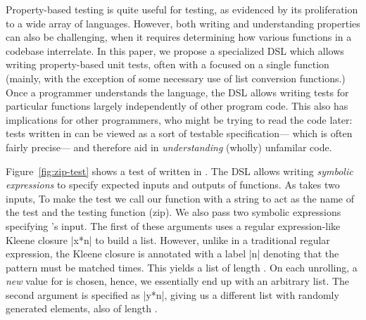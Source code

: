 Property-based testing is quite useful for testing,
as evidenced by its proliferation to a wide array of languages.
However,
both writing and understanding properties can also be challenging,
when it requires determining how various functions in a codebase interrelate.
In this paper,
we propose a specialized DSL \ourDSL
which allows writing property-based unit tests, often with a focused on a single function
(mainly, with the exception of some necessary use of list conversion functions.)
Once a programmer understands the language,
the DSL allows writing tests for particular functions largely independently of
other program code.
This also has implications for other programmers, who might be trying to read the code later:
tests written in \ourDSL can be viewed as a sort of testable specification--- which is often fairly precise---
and therefore aid in \textit{understanding} (wholly) unfamilar code.



Figure~\ref{fig:zip-test}
shows a test of  written in \ourDSL.
The DSL allows writing \textit{symbolic expressions}
to specify expected inputs and outputs of functions.
As  takes two inputs,
To make the test we call our  function with a string to act as the name of the test and the testing function (zip). 
We also pass two symbolic expressions
specifying 's input.
The first of these arguments
uses a regular expression-like Kleene closure \hskin|x*{n}| to build a list.
However, unlike in a traditional regular expression,
the Kleene closure is annotated with a label \hskin|{n}| denoting that the pattern must be matched  times.
This yields a list of length .
On each unrolling, a \textit{new} value for  is chosen,
hence, we essentially end up with an arbitrary list.
The second argument is specified as \hskin|y*{n}|,
giving us a different list with randomly generated elements,
also of length .

